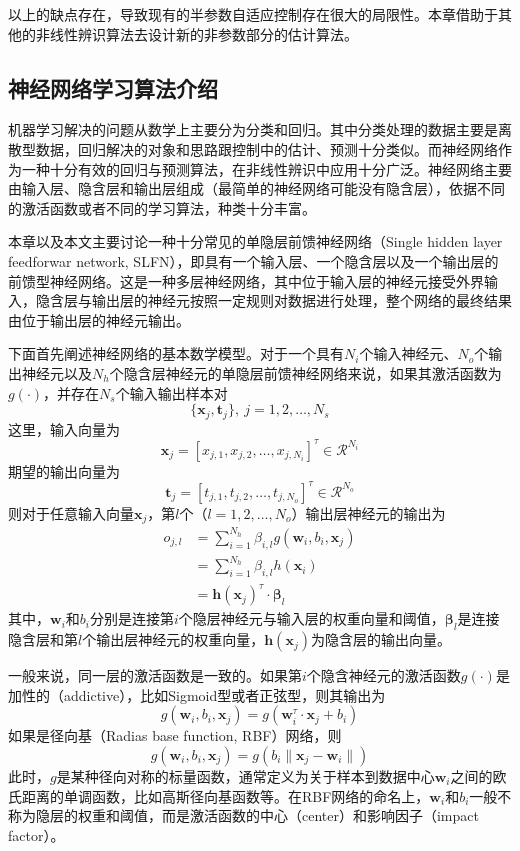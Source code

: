 以上的缺点存在，导致现有的半参数自适应控制存在很大的局限性。本章借助于其他的非线性辨识算法去设计新的非参数部分的估计算法。

\subsection{神经网络学习算法介绍}
机器学习解决的问题从数学上主要分为分类和回归。其中分类处理的数据主要是离散型数据，回归解决的对象和思路跟控制中的估计、预测十分类似。而神经网络作为一种十分有效的回归与预测算法，在非线性辨识中应用十分广泛。神经网络主要由输入层、隐含层和输出层组成（最简单的神经网络可能没有隐含层），依据不同的激活函数或者不同的学习算法，种类十分丰富。

本章以及本文主要讨论一种十分常见的单隐层前馈神经网络（Single hidden layer feedforwar network, SLFN），即具有一个输入层、一个隐含层以及一个输出层的前馈型神经网络。这是一种多层神经网络，其中位于输入层的神经元接受外界输入，隐含层与输出层的神经元按照一定规则对数据进行处理，整个网络的最终结果由位于输出层的神经元输出。

下面首先阐述神经网络的基本数学模型。对于一个具有$N_{i}$个输入神经元、$N_{o}$个输出神经元以及$N_{h}$个隐含层神经元的单隐层前馈神经网络来说，如果其激活函数为$g(\cdot)$，并存在$N_{s}$个输入输出样本对
$$\{\bm{x}_{j},\bm{t}_{j}\},\ j=1,2,\ldots,N_{s}$$
这里，输入向量为
$$\bm{x}_{j}=[x_{j,1},x_{j,2},\ldots,x_{j,N_{i}}]^{\tau}\in \mathcal{R}^{N_{i}}$$
期望的输出向量为
$$\bm{t}_{j}=[t_{j,1},t_{j,2},\ldots,t_{j,N_{o}}]^{\tau}\in \mathcal{R}^{N_{o}}$$
则对于任意输入向量$\bm{x}_{j}$，第$l$个（$l=1,2,\dots,N_{o}$）输出层神经元的输出为
\begin{equation}%
\label{eq:4.slfn.o}
\begin{split}%
o_{j,l}&=\sum_{i=1}^{N_{h}} \beta_{i,l} g(\bm{w}_{i},b_{i},\bm{x}_{j})\\
&=\sum_{i=1}^{N_{h}} \beta_{i,l} h(\bm{x}_{i})\\
&=\bm{h}(\bm{x}_{j})^{\tau}\cdot\bm{\beta}_{l}
\end{split}
\end{equation}
其中，$\bm{w}_{i}$和$b_{i}$分别是连接第$i$个隐层神经元与输入层的权重向量和阈值，$\bm{\beta}_{l}$是连接隐含层和第$l$个输出层神经元的权重向量，$\bm{h}(\bm{x}_{j})$为隐含层的输出向量。

一般来说，同一层的激活函数是一致的。如果第$i$个隐含神经元的激活函数$g(\cdot)$是加性的（addictive），比如Sigmoid型或者正弦型，则其输出为
\begin{equation}%
g(\bm{w}_{i},b_{i},\bm{x}_{j})=g(\bm{w}_{i}^{\tau}\cdot\bm{x}_{j}+b_{i})
\end{equation}
如果是径向基（Radias base function, RBF）网络，则
\begin{equation}%
g(\bm{w}_{i},b_{i},\bm{x}_{j})=g(b_{i}\|\bm{x}_{j}-\bm{w}_{i}\|)
\end{equation}
此时，$g$是某种径向对称的标量函数，通常定义为关于样本到数据中心$\bm{w}_{i}$之间的欧氏距离的单调函数，比如高斯径向基函数等。在RBF网络的命名上，$\bm{w}_{i}$和$b_{i}$一般不称为隐层的权重和阈值，而是激活函数的中心（center）和影响因子（impact factor）。

